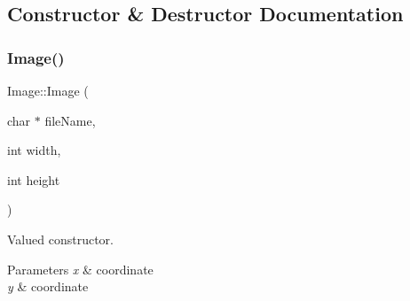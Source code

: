 \subsection{Constructor \& Destructor Documentation}
\mbox{\label{class_image_a742d8eafbcfe7e0b66a145bac182adb3}} 
\subsubsection{\texorpdfstring{Image()}{Image()}\hspace{0.1cm}{\footnotesize\ttfamily [1/2]}}
{\footnotesize\ttfamily Image\+::\+Image (\begin{DoxyParamCaption}\item[{char $\ast$}]{file\+Name,  }\item[{int}]{width,  }\item[{int}]{height }\end{DoxyParamCaption})}



Valued constructor. 


\begin{DoxyParams}{Parameters}
{\em x} & coordinate \\
\hline
{\em y} & coordinate \\
\hline
\end{DoxyParams}

